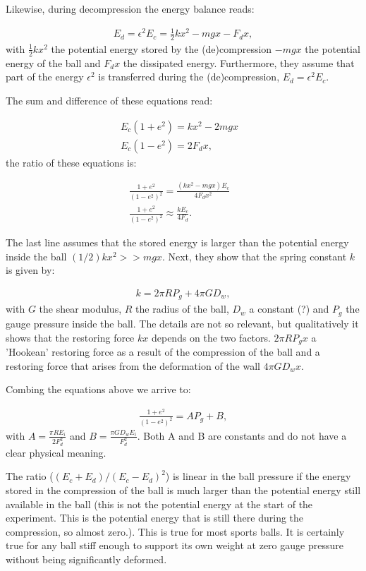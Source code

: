 \documentclass{article}
\begin{document}
Likewise, during decompression the energy balance reads:

\begin{align}
    E_d = \epsilon^2 E_c= \frac{1}{2}kx^2 - mgx - F_d x,
\end{align}
with $\frac{1}{2}kx^2$ the potential energy stored by the (de)compression $-mgx$ the potential energy of the ball and $F_dx$ the dissipated energy. Furthermore, they assume that part of the energy $\epsilon^2$ is transferred during the (de)compression, $E_d = \epsilon^2E_c$.

The sum and difference of these equations read:

\begin{align}
   E_c(1+e^2) = kx^2 -2mgx &\\
   E_c(1-e^2) = 2F_dx,
\end{align}
the ratio of these equations is:

\begin{align}
    \frac{1+e^2}{(1-e^2)^2} = \frac{(kx^2 -mgx) E_c}{4F_dx^2} & \\
    \frac{1+e^2}{(1-e^2)^2}  \approx \frac{k E_c}{4F_d}.
\end{align}

The last line assumes that the stored energy is larger than the potential energy inside the ball $(1/2)kx^2>>mgx$. Next, they show that the spring constant $k$ is given by:

\begin{align}
    k = 2\pi R P_g + 4\pi GD_w,
\end{align}
with $G$ the shear modulus, $R$ the radius of the ball, $D_w$ a constant (?) and $P_g$ the gauge pressure inside the ball. The details are not so relevant, but qualitatively it shows that the restoring force $kx$ depends on the two factors. $2\pi R P_g x$ a 'Hookean' restoring force as a result of the compression of the ball and a restoring force that arises from the deformation of the wall $4\pi G D_w x$.

Combing the equations above we arrive to:

\begin{align}
    \frac{1+e^2}{(1-e^2)^2}  = A P_g + B,
\end{align}
with $A = \frac{\pi R E_i}{2F_d^2}$ and $B = \frac{\pi GD_wE_i}{F_d^2}$. Both A and B are constants and do not have a clear physical meaning.

The ratio ($(E_c+E_d)/(E_c-E_d)^2$) is linear in the ball pressure if the energy stored in the compression of the ball is much larger than the potential energy still available in the ball (this is not the potential energy at the start of the experiment. This is the potential energy that is still there during the compression, so almost zero.). This is true for most sports balls. It is
certainly true for any ball stiff enough to support its own weight
at zero gauge pressure without being significantly deformed.
\end{document}
